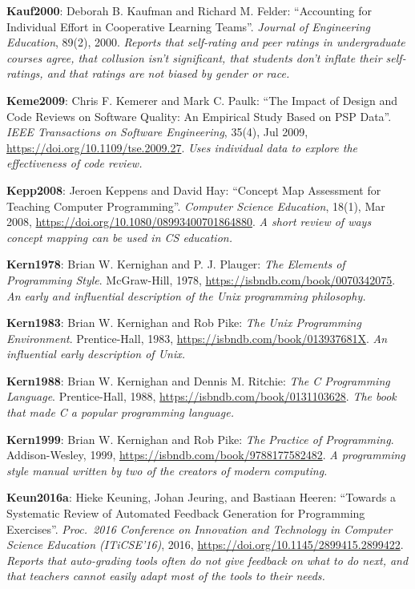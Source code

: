 \textbf{\hypertarget{b:Kauf2000}{Kauf2000}\label{b:Kauf2000}}: Deborah B. Kaufman and Richard M. Felder: ``Accounting for Individual Effort in Cooperative Learning Teams''. \emph{Journal of Engineering Education}, 89(2), 2000. \emph{Reports that self-rating and peer ratings in undergraduate courses agree, that collusion isn't significant, that students don't inflate their self-ratings, and that ratings are not biased by gender or race.}

\textbf{\hypertarget{b:Keme2009}{Keme2009}\label{b:Keme2009}}: Chris F. Kemerer and Mark C. Paulk: ``The Impact of Design and Code Reviews on Software Quality: An Empirical Study Based on PSP Data''. \emph{IEEE Transactions on Software Engineering}, 35(4), Jul 2009, \url{https://doi.org/10.1109/tse.2009.27}. \emph{Uses individual data to explore the effectiveness of code review.}

\textbf{\hypertarget{b:Kepp2008}{Kepp2008}\label{b:Kepp2008}}: Jeroen Keppens and David Hay: ``Concept Map Assessment for Teaching Computer Programming''. \emph{Computer Science Education}, 18(1), Mar 2008, \url{https://doi.org/10.1080/08993400701864880}. \emph{A short review of ways concept mapping can be used in CS education.}

\textbf{\hypertarget{b:Kern1978}{Kern1978}\label{b:Kern1978}}: Brian W. Kernighan and P. J. Plauger: \emph{The Elements of Programming Style}. McGraw-Hill, 1978, \url{https://isbndb.com/book/0070342075}. \emph{An early and influential description of the Unix programming philosophy.}

\textbf{\hypertarget{b:Kern1983}{Kern1983}\label{b:Kern1983}}: Brian W. Kernighan and Rob Pike: \emph{The Unix Programming Environment}. Prentice-Hall, 1983, \url{https://isbndb.com/book/013937681X}. \emph{An influential early description of Unix.}

\textbf{\hypertarget{b:Kern1988}{Kern1988}\label{b:Kern1988}}: Brian W. Kernighan and Dennis M. Ritchie: \emph{The C Programming Language}. Prentice-Hall, 1988, \url{https://isbndb.com/book/0131103628}. \emph{The book that made C a popular programming language.}

\textbf{\hypertarget{b:Kern1999}{Kern1999}\label{b:Kern1999}}: Brian W. Kernighan and Rob Pike: \emph{The Practice of Programming}. Addison-Wesley, 1999, \url{https://isbndb.com/book/9788177582482}. \emph{A programming style manual written by two of the creators of modern computing.}

\textbf{\hypertarget{b:Keun2016a}{Keun2016a}\label{b:Keun2016a}}: Hieke Keuning, Johan Jeuring, and Bastiaan Heeren: ``Towards a Systematic Review of Automated Feedback Generation for Programming Exercises''. \emph{Proc.\ 2016 Conference on Innovation and Technology in Computer Science Education (ITiCSE'16)}, 2016, \url{https://doi.org/10.1145/2899415.2899422}. \emph{Reports that auto-grading tools often do not give feedback on what to do next, and that teachers cannot easily adapt most of the tools to their needs.}


